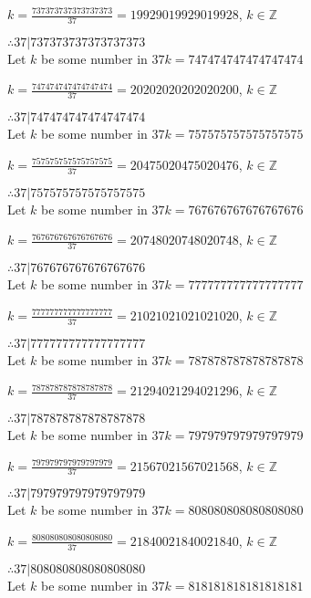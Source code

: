 \documentclass{article}
\begin{document}
$k = \frac{737373737373737373}{37} = 19929019929019928$, $k \in \mathbb{Z}$

$ \therefore  37|737373737373737373 $ \\

Let $k$ be some number in $37k = 747474747474747474$

$k = \frac{747474747474747474}{37} = 20202020202020200$, $k \in \mathbb{Z}$

$ \therefore  37|747474747474747474 $ \\

Let $k$ be some number in $37k = 757575757575757575$

$k = \frac{757575757575757575}{37} = 20475020475020476$, $k \in \mathbb{Z}$

$ \therefore  37|757575757575757575 $ \\

Let $k$ be some number in $37k = 767676767676767676$

$k = \frac{767676767676767676}{37} = 20748020748020748$, $k \in \mathbb{Z}$

$ \therefore  37|767676767676767676 $ \\

Let $k$ be some number in $37k = 777777777777777777$

$k = \frac{777777777777777777}{37} = 21021021021021020$, $k \in \mathbb{Z}$

$ \therefore  37|777777777777777777 $ \\

Let $k$ be some number in $37k = 787878787878787878$

$k = \frac{787878787878787878}{37} = 21294021294021296$, $k \in \mathbb{Z}$

$ \therefore  37|787878787878787878 $ \\

Let $k$ be some number in $37k = 797979797979797979$

$k = \frac{797979797979797979}{37} = 21567021567021568$, $k \in \mathbb{Z}$

$ \therefore  37|797979797979797979 $ \\

Let $k$ be some number in $37k = 808080808080808080$

$k = \frac{808080808080808080}{37} = 21840021840021840$, $k \in \mathbb{Z}$

$ \therefore  37|808080808080808080 $ \\

Let $k$ be some number in $37k = 818181818181818181$
\end{document}
